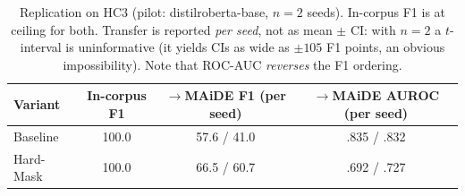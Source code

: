 \documentclass[10pt,twocolumn]{article}
\begin{document}
\begin{table}[tb]\centering
\caption{Replication on HC3 (pilot: distilroberta-base, $n{=}2$ seeds). In-corpus F1 is at ceiling for both. Transfer is reported \emph{per seed}, not as mean $\pm$ CI: with $n{=}2$ a $t$-interval is uninformative (it yields CIs as wide as $\pm105$ F1 points, an obvious impossibility). Note that ROC-AUC \emph{reverses} the F1 ordering.}
\label{tab:hc3}
\footnotesize
\begin{tabular}{lccc}
\toprule
Variant & In-corpus F1 & \shortstack{$\rightarrow$MAiDE F1\\(per seed)} & \shortstack{$\rightarrow$MAiDE AUROC\\(per seed)} \\
\midrule
Baseline & 100.0 & 57.6 / 41.0 & .835 / .832 \\
Hard-Mask & 100.0 & 66.5 / 60.7 & .692 / .727 \\
\bottomrule
\end{tabular}
\end{table}
\end{document}
